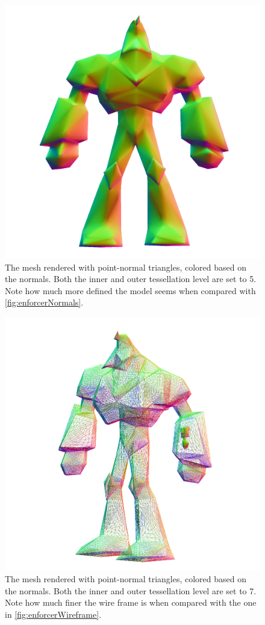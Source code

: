 \documentclass[a4paper,10pt]{article}
\begin{document}
\begin{figure}
	\includegraphics[width=\textwidth]{enforcer_normals_pn_i5_o5.png}
	\caption{The mesh rendered with point-normal triangles, colored based on the normals. Both the inner and outer tessellation level are set to 5. Note how much more defined the model seems when compared with \cref{fig:enforcerNormals}.}
	\label{fig:enforcerNormals5}		
\end{figure}

\begin{figure}
	\includegraphics[width=\textwidth]{enforcer_normals_pn_i7_o7.png}
	\caption{The mesh rendered with point-normal triangles, colored based on the normals. Both the inner and outer tessellation level are set to 7. Note how much finer the wire frame is when compared with the one in \cref{fig:enforcerWireframe}.}		
	\label{fig:enforcerNormals7}	
\end{figure}
\end{document}
